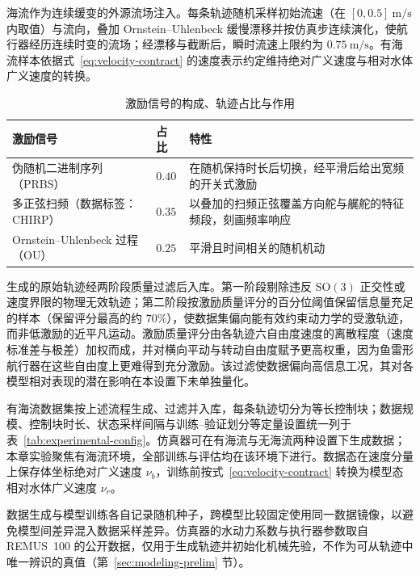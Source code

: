 \documentclass[UTF8,zihao=-4]{ctexrep}
\newcommand{\SO}{\mathrm{SO}}
\begin{document}
海流作为连续缓变的外源流场注入。每条轨迹随机采样初始流速（在 \([0,0.5]~\mathrm{m/s}\) 内取值）与流向，叠加 Ornstein--Uhlenbeck 缓慢漂移并按仿真步连续演化，使航行器经历连续时变的流场；经漂移与截断后，瞬时流速上限约为 \(0.75~\mathrm{m/s}\)。有海流样本依据式~\eqref{eq:velocity-contract} 的速度表示约定维持绝对广义速度与相对水体广义速度的转换。

\begin{table}[htbp]
  \centering
  \caption{激励信号的构成、轨迹占比与作用}
  \label{tab:excitation-signals}
  \begin{tabularx}{\textwidth}{>{\raggedright\arraybackslash}p{} >{\centering\arraybackslash}p{} >{\raggedright\arraybackslash}X}
    \toprule
    激励信号 & 占比 & 特性 \\
    \midrule
    伪随机二进制序列（PRBS）& \(0.40\) & 在随机保持时长后切换，经平滑后给出宽频的开关式激励 \\
    多正弦扫频（数据标签：CHIRP）& \(0.35\) & 以叠加的扫频正弦覆盖方向舵与艉舵的特征频段，刻画频率响应 \\
    Ornstein--Uhlenbeck 过程（OU）& \(0.25\) & 平滑且时间相关的随机机动 \\
    \bottomrule
  \end{tabularx}
\end{table}

生成的原始轨迹经两阶段质量过滤后入库。第一阶段剔除违反 \(\SO(3)\) 正交性或速度界限的物理无效轨迹；第二阶段按激励质量评分的百分位阈值保留信息量充足的样本（保留评分最高的约 \(70\%\)），使数据集偏向能有效约束动力学的受激轨迹，而非低激励的近平凡运动。激励质量评分由各轨迹六自由度速度的离散程度（速度标准差与极差）加权而成，并对横向平动与转动自由度赋予更高权重，因为鱼雷形航行器在这些自由度上更难得到充分激励。该过滤使数据偏向高信息工况，其对各模型相对表现的潜在影响在本设置下未单独量化。

有海流数据集按上述流程生成、过滤并入库，每条轨迹切分为等长控制块；数据规模、控制块时长、状态采样间隔与训练--验证划分等定量设置统一列于表~\ref{tab:experimental-config}。仿真器可在有海流与无海流两种设置下生成数据；本章实验聚焦有海流环境，全部训练与评估均在该环境下进行。数据态在速度分量上保存体坐标绝对广义速度 \(\nu_b\)，训练前按式~\eqref{eq:velocity-contract} 转换为模型态相对水体广义速度 \(\nu_r\)。

数据生成与模型训练各自记录随机种子，跨模型比较固定使用同一数据镜像，以避免模型间差异混入数据采样差异。仿真器的水动力系数与执行器参数取自 REMUS~100 的公开数据，仅用于生成轨迹并初始化机械先验，不作为可从轨迹中唯一辨识的真值（第~\ref{sec:modeling-prelim} 节）。
\end{document}

